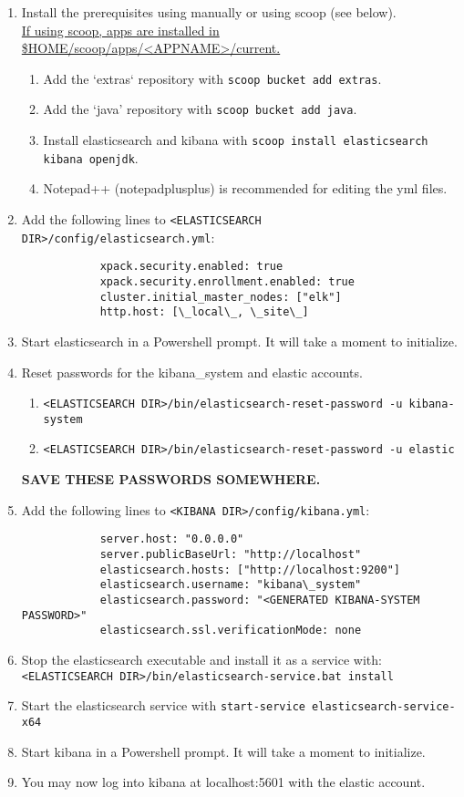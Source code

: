 \documentclass[12pt,letterpaper]{article}
\def\code#1{\textcolor{c2}{\texttt{#1}}}
\def\bf#1{\textbf{#1}}
\def\ul#1{\underline{#1}}
\begin{document}
\begin{enumerate}
	\item Install the prerequisites	using manually or using scoop (see below). \\
	\ul{If using scoop, apps are installed in \$HOME/scoop/apps/<APPNAME>/current.}
		\begin{enumerate}
			\item Add the `extras` repository with \code{scoop bucket add extras}.
			\item Add the `java' repository with \code{scoop bucket add java}.
			\item Install elasticsearch and kibana with \code{scoop install elasticsearch kibana openjdk}.
			\item Notepad++ (notepadplusplus) is recommended for editing the yml files.
		\end{enumerate}
	\item Add the following lines to \code{<ELASTICSEARCH DIR>/config/elasticsearch.yml}:
		\begin{verbatim}
			xpack.security.enabled: true
			xpack.security.enrollment.enabled: true
			cluster.initial_master_nodes: ["elk"]
			http.host: [\_local\_, \_site\_]		
		\end{verbatim}
	\item Start elasticsearch in a Powershell prompt. It will take a moment to initialize.
	\item Reset passwords for the kibana\_system and elastic accounts.
		\begin{enumerate}
			\item \code{<ELASTICSEARCH DIR>/bin/elasticsearch-reset-password -u kibana-system}
			\item \code{<ELASTICSEARCH DIR>/bin/elasticsearch-reset-password -u elastic}
		\end{enumerate}
	\bf{SAVE THESE PASSWORDS SOMEWHERE.}
	\item Add the following lines to \code{<KIBANA DIR>/config/kibana.yml}:
		\begin{verbatim}
			server.host: "0.0.0.0"
			server.publicBaseUrl: "http://localhost"
			elasticsearch.hosts: ["http://localhost:9200"]
			elasticsearch.username: "kibana\_system"
			elasticsearch.password: "<GENERATED KIBANA-SYSTEM PASSWORD>"
			elasticsearch.ssl.verificationMode: none
		\end{verbatim}
	\item Stop the elasticsearch executable and install it as a service with: \\
		\code{<ELASTICSEARCH DIR>/bin/elasticsearch-service.bat install} 
	\item Start the elasticsearch service with \code{start-service elasticsearch-service-x64}
	\item Start kibana in a Powershell prompt. It will take a moment to initialize.
	\item You may now log into kibana at localhost:5601 with the elastic account.
\end{enumerate}
\end{document}
